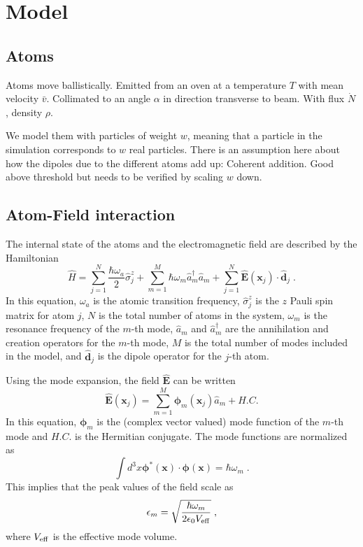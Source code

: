 \documentclass[aps, superscriptaddress, groupedaddress, preprint]{revtex4}
\renewcommand\vec{\mathbf}
\begin{document}
\tableofcontents

\section{Model}


\subsection{Atoms}

Atoms move ballistically.  Emitted from an oven at a temperature
$T$ with mean velocity $\bar{v}$.  Collimated to an angle
$\alpha$ in direction transverse to beam.  With flux $\dot N$,
density $\rho$.

We model them with particles of weight $w$, meaning that a
particle in the simulation corresponds to $w$ real particles.
There is an assumption here about how the dipoles due to the
different atoms add up: Coherent addition.  Good above threshold
but needs to be verified by scaling $w$ down.


\subsection{Atom-Field interaction}

The internal state of the atoms and the electromagnetic field are
described  by the Hamiltonian
\begin{equation}
  \hat H =
  \sum_{j=1}^N \frac{\hbar \omega_a}{2}\hat \sigma_j^z +
  \sum_{m=1}^M \hbar\omega_m\hat a_m^\dagger\hat a_m +
  \sum_{j=1}^N \vec{\hat E}(\vec{x}_j)\cdot \vec{\hat d}_j\;.
  \label{eqn:Hamiltonian}
\end{equation}
In this equation, $\omega_a$ is the atomic transition frequency,
$\hat\sigma_j^z$ is the $z$ Pauli spin matrix for atom $j$, $N$
is the total number of atoms in the system, $\omega_m$ is the
resonance frequency of the $m$-th mode, $\hat a_m$ and $\hat
a_m^\dagger$ are the annihilation and creation operators for the
$m$-th mode, $M$ is the total number of modes included in the
model, and $\vec{\hat{d}}_j$ is the dipole operator for the $j$-th
atom.

Using the mode expansion, the field $\vec{\hat E}$ can be written
\begin{equation}
  \vec{\hat E}(\vec{x}_j) =
  \sum_{m=1}^M\vec{\phi}_m(\vec{x}_j) \hat a_m + H.C.
\end{equation}
In this equation, $\vec{\phi}_m$ is the (complex vector valued)
mode function of the $m$-th mode and $H.C.$ is the Hermitian
conjugate.  The mode functions are normalized as
\begin{equation}
  \int d^3x \vec{\phi}^*(\vec{x})\cdot\vec{\phi}(\vec{x}) =
  \hbar\omega_m\;.
\end{equation}
This implies that the peak values of the field scale as
\begin{equation}
  \epsilon_m = \sqrt{\frac{\hbar\omega_m}{2\epsilon_0V_{\rm eff}}}\;,
\end{equation}
where $V_{\rm eff}$ is the effective mode volume.
\end{document}
